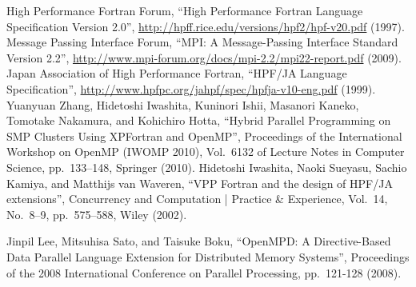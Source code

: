 \documentclass[a4paper,11pt]{report}
\begin{document}















\begin{thebibliography}{99}
  High Performance Fortran Forum,
	 ``High Performance Fortran Language Specification Version 2.0'',
	 \url{http://hpff.rice.edu/versions/hpf2/hpf-v20.pdf}
	 (1997).
 Message Passing Interface Forum,
	``MPI: A Message-Passing Interface Standard Version 2.2'',
	\url{http://www.mpi-forum.org/docs/mpi-2.2/mpi22-report.pdf}
	(2009).
  Japan Association of High Performance Fortran,
	 ``HPF/JA Language Specification'',
	 \url{http://www.hpfpc.org/jahpf/spec/hpfja-v10-eng.pdf}
	 (1999).
  Yuanyuan Zhang, Hidetoshi Iwashita, Kuninori Ishii,
	 Masanori Kaneko, Tomotake Nakamura, and Kohichiro Hotta,
	 ``Hybrid Parallel Programming on SMP Clusters Using XPFortran
	 and OpenMP'',
	 Proceedings of the International Workshop on OpenMP (IWOMP
	 2010), 
	 Vol.~6132 of Lecture Notes in Computer Science,
	 pp.~133--148,
	 Springer
	 (2010).
  Hidetoshi Iwashita, Naoki Sueyasu, Sachio Kamiya,
	 and Matthijs van Waveren,
	 ``VPP Fortran and the design of HPF/JA extensions'',
	 Concurrency and Computation | Practice \& Experience,
	 Vol.~14, No.~8--9, pp.~575--588,
	 Wiley
	 (2002).

  Jinpil Lee, Mitsuhisa Sato, and Taisuke Boku,
	 ``OpenMPD: A Directive-Based Data Parallel Language Extension
	 for Distributed Memory Systems'',
	 Proceedings of the 2008 International Conference on Parallel
	 Processing, pp.~121-128
	 (2008).
\end{thebibliography}

\appendix



\printindex
\end{document}
